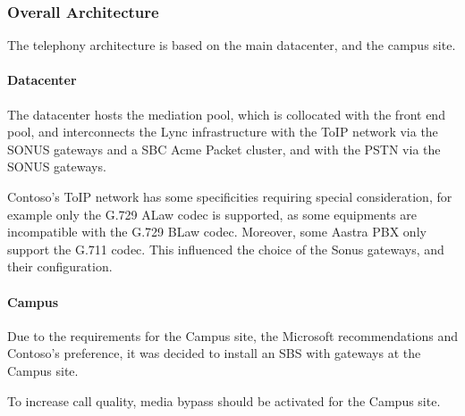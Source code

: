 \subsubsection{Overall Architecture}
	The telephony architecture is based on the main datacenter, and the campus site.

	\paragraph{Datacenter}
	The datacenter hosts the mediation pool, which is collocated with the front end pool, and interconnects the Lync infrastructure with the ToIP network via the SONUS gateways and a SBC Acme Packet cluster, and with the PSTN via the SONUS gateways.
	
	Contoso's ToIP network has some specificities requiring special consideration, for example only the G.729 ALaw codec is supported, as some equipments are incompatible with the G.729 BLaw codec. Moreover, some Aastra PBX only support the G.711 codec. This influenced the choice of the Sonus gateways, and their configuration.
	

	\paragraph{Campus}
	Due to the requirements for the Campus site, the Microsoft recommendations and Contoso's preference, it was decided to install an SBS with gateways at the Campus site.
	
	To increase call quality, media bypass should be activated for the Campus site.


